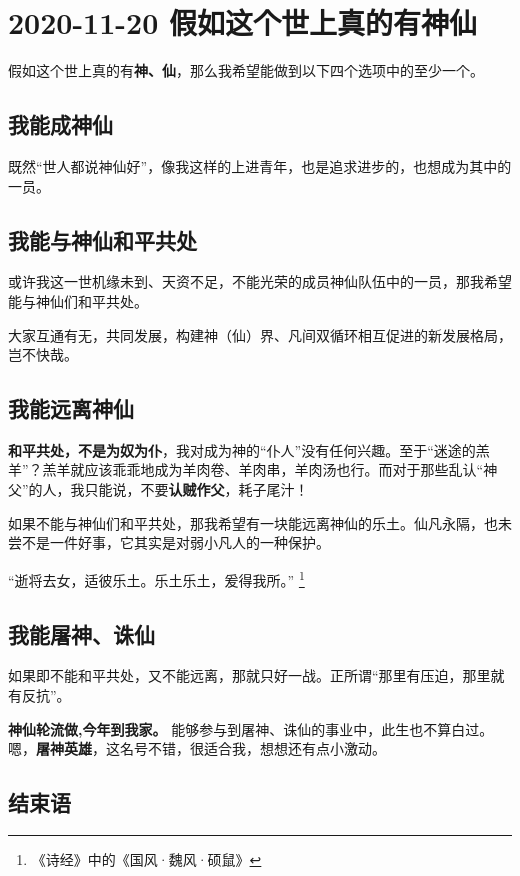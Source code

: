 \section{2020-11-20 假如这个世上真的有神仙}

假如这个世上真的有\textbf{神、仙}，那么我希望能做到以下四个选项中的至少一个。

\subsection{我能成神仙}

既然“世人都说神仙好”，像我这样的上进青年，也是追求进步的，也想成为其中的一员。

\subsection{我能与神仙和平共处}

或许我这一世机缘未到、天资不足，不能光荣的成员神仙队伍中的一员，那我希望能与神仙们和平共处。

大家互通有无，共同发展，构建神（仙）界、凡间双循环相互促进的新发展格局，岂不快哉。

\subsection{我能远离神仙}

\textbf{和平共处，不是为奴为仆}，我对成为神的“仆人”没有任何兴趣。至于“迷途的羔羊”？羔羊就应该乖乖地成为羊肉卷、羊肉串，羊肉汤也行。而对于那些乱认“神父”的人，我只能说，不要\textbf{\color{red}认贼作父}，耗子尾汁！

如果不能与神仙们和平共处，那我希望有一块能远离神仙的乐土。仙凡永隔，也未尝不是一件好事，它其实是对弱小凡人的一种保护。

“逝将去女，适彼乐土。乐土乐土，爰得我所。” \footnote{《诗经》中的《国风·魏风·硕鼠》}

\subsection{我能屠神、诛仙}

如果即不能和平共处，又不能远离，那就只好一战。正所谓“那里有压迫，那里就有反抗”。

\textbf{神仙轮流做,今年到我家。} 能够参与到屠神、诛仙的事业中，此生也不算白过。嗯，\textbf{屠神英雄}，这名号不错，很适合我，想想还有点小激动。

\subsection{结束语}

